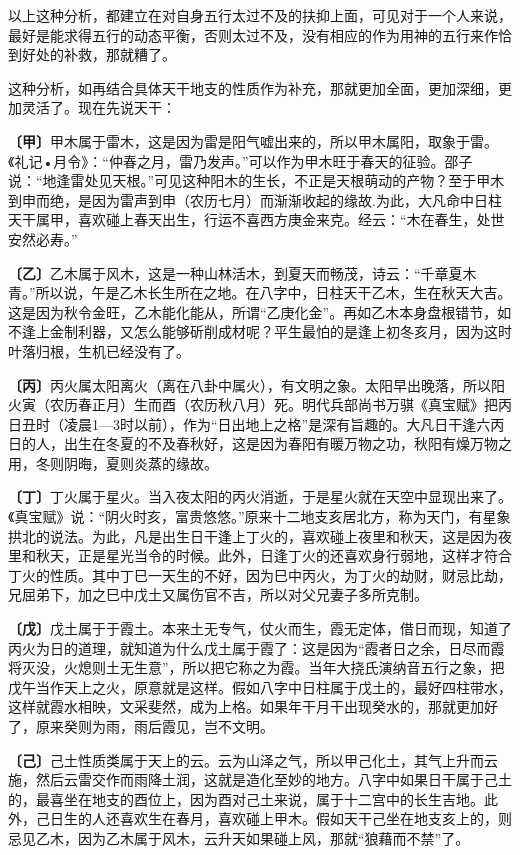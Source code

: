 \documentclass[a5paper,oneside,12pt]{ctexbook}
\begin{document}
以上这种分析，都建立在对自身五行太过不及的扶抑上面，可见对于一个人来说，最好是能求得五行的动态平衡，否则太过不及，没有相应的作为用神的五行来作恰到好处的补救，那就糟了。

这种分析，如再结合具体天干地支的性质作为补充，那就更加全面，更加深细，更加灵活了。现在先说天干：

\textbf{〔甲〕}甲木属于雷木，这是因为雷是阳气嘘出来的，所以甲木属阳，取象于雷。《礼记•月令》：“仲春之月，雷乃发声。”可以作为甲木旺于春天的征验。邵子说：“地逢雷处见天根。”可见这种阳木的生长，不正是天根萌动的产物？至于甲木到申而绝，是因为雷声到申（农历七月）而渐渐收起的缘故.为此，大凡命中日柱天干属甲，喜欢碰上春天出生，行运不喜西方庚金来克。经云：“木在春生，处世安然必寿。”

\textbf{〔乙〕}乙木属于风木，这是一种山林活木，到夏天而畅茂，诗云：“千章夏木青。”所以说，午是乙木长生所在之地。在八字中，日柱天干乙木，生在秋天大吉。这是因为秋令金旺，乙木能化能从，所谓“乙庚化金”。再如乙木本身盘根错节，如不逢上金制利器，又怎么能够斫削成材呢？平生最怕的是逢上初冬亥月，因为这时叶落归根，生机已经没有了。

\textbf{〔丙〕}丙火属太阳离火（离在八卦中属火），有文明之象。太阳早出晚落，所以阳火寅（农历春正月）生而酉（农历秋八月）死。明代兵部尚书万骐《真宝赋》把丙日丑时（凌晨1—3时以前），作为“日出地上之格”是深有旨趣的。大凡日干逢六丙日的人，出生在冬夏的不及春秋好，这是因为春阳有暖万物之功，秋阳有燥万物之用，冬则阴晦，夏则炎蒸的缘故。

\textbf{〔丁〕}丁火属于星火。当入夜太阳的丙火消逝，于是星火就在天空中显现出来了。《真宝赋》说：“阴火时亥，富贵悠悠。”原来十二地支亥居北方，称为天门，有星象拱北的说法。为此，凡是出生日干逢上丁火的，喜欢碰上夜里和秋天，这是因为夜里和秋天，正是星光当令的时候。此外，日逢丁火的还喜欢身行弱地，这样才符合丁火的性质。其中丁巳一天生的不好，因为巳中丙火，为丁火的劫财，财忌比劫，兄屈弟下，加之巳中戊土又属伤官不吉，所以对父兄妻子多所克制。

\textbf{〔戊〕}戊土属于于霞土。本来土无专气，仗火而生，霞无定体，借日而现，知道了丙火为日的道理，就知道为什么戊土属于霞了：这是因为“霞者日之余，日尽而霞将灭没，火熄则土无生意”，所以把它称之为霞。当年大挠氏演纳音五行之象，把戊午当作天上之火，原意就是这样。假如八字中日柱属于戊土的，最好四柱带水，这样就霞水相映，文采斐然，成为上格。如果年干月干出现癸水的，那就更加好了，原来癸则为雨，雨后霞见，岂不文明。

\textbf{〔己〕}己土性质类属于天上的云。云为山泽之气，所以甲己化土，其气上升而云施，然后云雷交作而雨降土润，这就是造化至妙的地方。八字中如果日干属于己土的，最喜坐在地支的酉位上，因为酉对己土来说，属于十二宫中的长生吉地。此外，己日生的人还喜欢生在春月，喜欢碰上甲木。假如天干己坐在地支亥上的，则忌见乙木，因为乙木属于风木，云升天如果碰上风，那就“狼藉而不禁”了。
\end{document}
